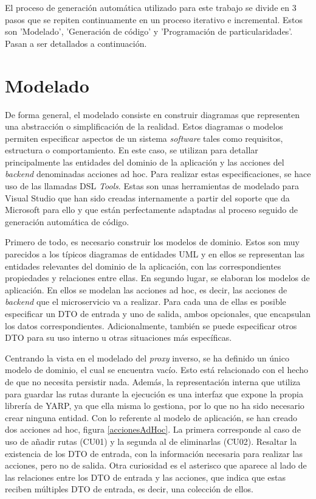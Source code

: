 \documentclass[11pt,spanish,listoffigures]{tfgetsinf}
\begin{document}
El proceso de generación automática utilizado para este trabajo se divide en 3 pasos que se repiten continuamente en un proceso iterativo e incremental. Estos son 'Modelado', 'Generación de código' y 'Programación de particularidades'. Pasan a ser detallados a continuación.

	\section{Modelado}

De forma general, el modelado consiste en construir diagramas que representen una abstracción o simplificación de la realidad. Estos diagramas o modelos permiten especificar aspectos de un sistema \emph{software} tales como requisitos, estructura o comportamiento. En este caso, se utilizan para detallar principalmente las entidades del dominio de la aplicación y las acciones del \emph{backend} denominadas acciones ad hoc. Para realizar estas especificaciones, se hace uso de las llamadas DSL \emph{Tools}. Estas son unas herramientas de modelado para Visual Studio que han sido creadas internamente a partir del soporte que da Microsoft para ello \cite{DSL} y que están perfectamente adaptadas al proceso seguido de generación automática de código.

Primero de todo, es necesario construir los modelos de dominio. Estos son muy parecidos a los típicos diagramas de entidades UML y en ellos se representan las entidades relevantes del dominio de la aplicación, con las correspondientes propiedades y relaciones entre ellas. En segundo lugar, se elaboran los modelos de aplicación. En ellos se modelan las acciones ad hoc, es decir, las acciones de \emph{backend} que el microservicio va a realizar. Para cada una de ellas es posible especificar un DTO de entrada y uno de salida, ambos opcionales, que encapsulan los datos correspondientes. Adicionalmente, también se puede especificar otros DTO para su uso interno u otras situaciones más específicas.

Centrando la vista en el modelado del \emph{proxy} inverso, se ha definido un único modelo de dominio, el cual se encuentra vacío. Esto está relacionado con el hecho de que no necesita persistir nada. Además, la representación interna que utiliza para guardar las rutas durante la ejecución es una interfaz que expone la propia librería de YARP, ya que ella misma lo gestiona, por lo que no ha sido necesario crear ninguna entidad. Con lo referente al modelo de aplicación, se han creado dos acciones ad hoc, figura \ref{accionesAdHoc}. La primera corresponde al caso de uso de añadir rutas (CU01) y la segunda al de eliminarlas (CU02). Resaltar la existencia de los DTO de entrada, con la información necesaria para realizar las acciones, pero no de salida. Otra curiosidad es el asterisco que aparece al lado de las relaciones entre los DTO de entrada y las acciones, que indica que estas reciben múltiples DTO de entrada, es decir, una colección de ellos.
\end{document}
